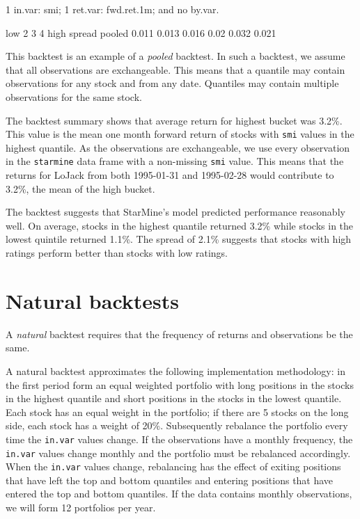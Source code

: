 \documentclass[a4paper]{report}
\begin{document}
\begin{article}
\begin{Schunk}
\begin{Soutput}
1 in.var: smi;
1 ret.var: fwd.ret.1m;
and no by.var.

         low     2     3    4  high spread
pooled 0.011 0.013 0.016 0.02 0.032  0.021
\end{Soutput}
\end{Schunk}

This backtest is an example of a \emph{pooled} backtest. In such a
backtest, we assume that all observations are exchangeable.  This
means that a quantile may contain observations for any stock and from
any date.  Quantiles may contain multiple observations for the same
stock.

The backtest summary shows that average return for highest bucket was
3.2\%.  This value is the mean one month forward return of stocks with
\texttt{smi} values in the highest quantile.  As the observations are
exchangeable, we use every observation in the \texttt{starmine} data
frame with a non-missing \texttt{smi} value.  This means that the
returns for LoJack from both 1995-01-31 and 1995-02-28 would
contribute to 3.2\%, the mean of the high bucket.

The backtest suggests that StarMine's model predicted performance
reasonably well.  On average, stocks in the highest quantile returned
3.2\% while stocks in the lowest quintile returned 1.1\%.  The spread
of 2.1\% suggests that stocks with high ratings perform better than
stocks with low ratings.

\section*{Natural backtests}

A \emph{natural} backtest requires that the frequency of returns and
observations be the same.  

A natural backtest approximates the following implementation
methodology: in the first period form an equal weighted portfolio with
long positions in the stocks in the highest quantile and short
positions in the stocks in the lowest quantile.  Each stock has an
equal weight in the portfolio; if there are 5 stocks on the long side,
each stock has a weight of 20\%.  Subsequently rebalance the portfolio
every time the \texttt{in.var} values change.  If the observations
have a monthly frequency, the \texttt{in.var} values change monthly
and the portfolio must be rebalanced accordingly.  When the
\texttt{in.var} values change, rebalancing has the effect of exiting
positions that have left the top and bottom quantiles and entering
positions that have entered the top and bottom quantiles.  If the data
contains monthly observations, we will form 12 portfolios per year.


\end{article}
\end{document}
